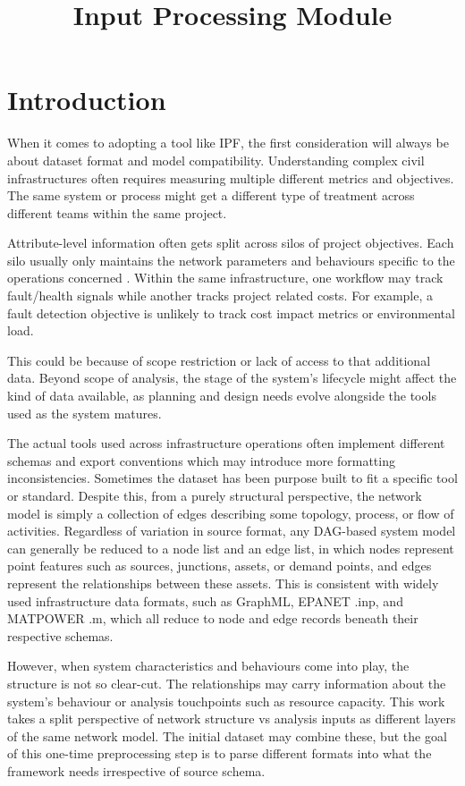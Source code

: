 \documentclass[12pt]{report}
\begin{document}
\title{Input Processing Module}
\fi


\section{Introduction}

When it comes to adopting a tool like IPF, the first consideration will always be about dataset format and model compatibility. Understanding complex civil infrastructures often requires measuring multiple different metrics and objectives. The same system or process might get a different type of treatment across different teams within the same project.

Attribute-level information often gets split across silos of project objectives. Each silo usually only maintains the network parameters and behaviours specific to the operations concerned . Within the same infrastructure, one workflow may track fault/health signals while another tracks project related costs. For example, a fault detection objective is unlikely to track cost impact metrics or environmental load.

This could be because of scope restriction or lack of access to that additional data. Beyond scope of analysis, the stage of the system's lifecycle might affect the kind of data available, as planning and design needs evolve alongside the tools used as the system matures.

The actual tools used across infrastructure operations often implement different schemas and export conventions which may introduce more formatting inconsistencies. Sometimes the dataset has been purpose built to fit a specific tool or standard. Despite this, from a purely structural perspective, the network model is simply a collection of edges describing some topology, process, or flow of activities. Regardless of variation in source format, any DAG-based system model can generally be reduced to a node list and an edge list, in which nodes represent point features such as sources, junctions, assets, or demand points, and edges represent the relationships between these assets. This is consistent with widely used infrastructure data formats, such as GraphML, EPANET .inp, and MATPOWER .m, which all reduce to node and edge records beneath their respective schemas.

However, when system characteristics and behaviours come into play, the structure is not so clear-cut. The relationships may carry information about the system's behaviour or analysis touchpoints such as resource capacity. This work takes a split perspective of network structure vs analysis inputs as different layers of the same network model. The initial dataset may combine these, but the goal of this one-time preprocessing step is to parse different formats into what the framework needs irrespective of source schema.
\end{document}
